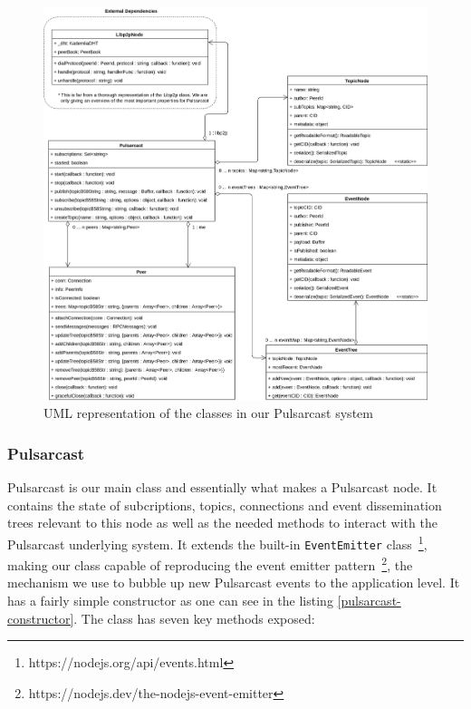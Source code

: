 \begin{figure}[hb!]
  \center
  \includegraphics[width=1\textwidth]{img/uml-pulsarcast.png}
  \caption{UML representation of the classes in our Pulsarcast system}
  \label{fig:pulsarcast-uml}
\end{figure}

\subsubsection{Pulsarcast}\label{subsubsec:pulsarcast}

Pulsarcast is our main class and essentially what makes a Pulsarcast node. It
contains the state of subcriptions, topics, connections and event dissemination
trees relevant to this node as well as the needed methods to interact with the
Pulsarcast underlying system. It extends the built-in \verb|EventEmitter|
class~\footnote{https://nodejs.org/api/events.html}, making our class capable
of reproducing the event emitter
pattern~\footnote{https://nodejs.dev/the-nodejs-event-emitter}, the mechanism
we use to bubble up new Pulsarcast events to the application level. It has a
fairly simple constructor as one can see in the listing
\ref{pulsarcast-constructor}. The class has seven key methods exposed:

